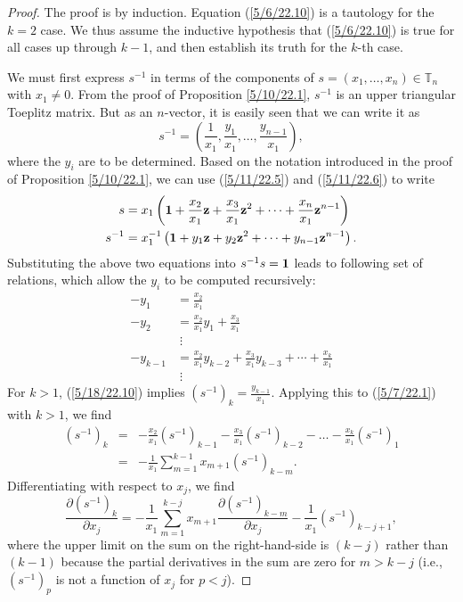 \documentclass{amsart}
\numberwithin{equation}{section}
\theoremstyle{definition}
\numberwithin{theorem}{section}
\begin{document}
\begin{proof} The proof is by induction. Equation (\ref{5/6/22.10}) is a tautology for the $k=2$ case.  We thus assume the inductive hypothesis that (\ref{5/6/22.10}) is true  for all cases up through $k-1$, and then establish its truth for the $k$-th case.

We must first express $s^{-1}$ in terms of the components of  $s=(x_1,\dots,x_n)\in \mathbb{T}_n$ with $x_1\ne 0$.   From the proof of Proposition \ref{5/10/22.1},  $s^{-1}$ is an upper triangular Toeplitz matrix.  But as an $n$-vector, it is easily seen that we can write it as  \begin{equation}\label{5/9/22.1} s^{-1} = (\frac{1}{x_1}, \frac{y_1}{x_1},\dots, \frac{y_{n-1}}{x_1}),\end{equation} where the $y_i$ are to be determined. 
Based on the notation introduced in the proof of Proposition \ref{5/10/22.1}, we can use (\ref{5/11/22.5}) and (\ref{5/11/22.6}) to write 
\begin{align}\nonumber s &= x_1 \left({\bf 1} + \frac{x_2}{x_1} {\bf z} + \frac{x_3}{x_1} {\bf z}^2 + \cdots + \frac{x_n}{x_1} {\bf z}^{n-1}\right)\\ s^{-1} &= x_1^{-1} \left({\bf 1} + y_1 {\bf z} + y_2 {\bf z}^2 + \cdots + y_{n-1} {\bf z}^{n-1}\right).  \label{5/18/22.10} \end{align}  Substituting the above two equations into $s^{-1} s = {\bf 1}$ leads to following set of relations, which allow the $y_i$ to be computed recursively:
\begin{align} -y_1 &= \frac{x_2}{x_1} \nonumber \\ -y_2 &= \frac{x_2}{x_1}y_1 + \frac{x_3}{x_1} \nonumber \\ &\;\vdots \nonumber \\ -y_{k-1} &= \frac{x_2}{x_1} y_{k-2} + \frac{x_3}{x_1} y_{k-3} + \cdots + \frac{x_k}{x_1} \label{5/7/22.1} \\ &\;\vdots \nonumber \end{align} 
 For $k>1$, (\ref{5/18/22.10}) implies  $\left( s^{-1} \right)_k = \frac{y_{k-1}}{x_1}$.  Applying this to (\ref{5/7/22.1}) with $k>1$, we find
\begin{eqnarray} \nonumber \left( s^{-1} \right)_k &=& -\frac{x_2}{x_1}\left( s^{-1} \right)_{k-1} - \frac{x_3}{x_1}\left( s^{-1} \right)_{k-2} -\dots  - \frac{x_k}{x_1}\left( s^{-1} \right)_1 \\ &=& -\frac{1}{x_1}\sum_{m=1}^{k-1} x_{m+1}\left( s^{-1} \right)_{k-m}. \label{5/7/22.2}\end{eqnarray}
Differentiating with respect to $x_j$, we find \begin{equation}  \frac{\partial \left( s^{-1} \right)_k}{\partial x_j} = -\frac{1}{x_1} \sum_{m=1}^{k-j} x_{m+1} \frac{\partial \left( s^{-1} \right)_{k-m}}{\partial x_j} -  \frac{1}{x_1}\left( s^{-1} \right)_{k-j+1} \label{5/7/22.4}, \end{equation} where the upper limit on the sum on the right-hand-side is $(k-j)$ rather than $(k-1)$ because the partial derivatives in the sum are zero for $m> k-j$ (i.e., $\left( s^{-1} \right)_p$ is not a function of $x_j$ for $p<j$).  


\end{proof}
\end{document}
